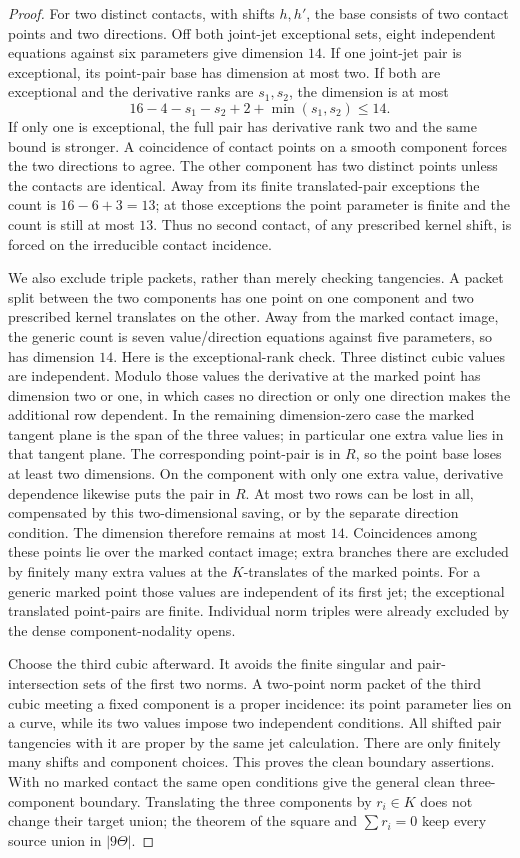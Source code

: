 \begin{proof}
For two distinct contacts, with shifts $h,h'$, the base consists
of two contact points and two directions. Off both joint-jet
exceptional sets, eight independent equations against six
parameters give dimension $14$. If one joint-jet pair is
exceptional, its point-pair base has dimension at most two.
If both are exceptional and the derivative ranks are $s_1,s_2$,
the dimension is at most
\[
       16-4-s_1-s_2+2+\min(s_1,s_2)\le14.        \tag{N9.1}
\]
If only one is exceptional, the full pair has derivative rank two
and the same bound is stronger. A coincidence of contact points
on a smooth component forces the two directions to agree.
The other component has two distinct points unless the contacts
are identical. Away from its finite translated-pair exceptions
the count is $16-6+3=13$; at those exceptions the point parameter
is finite and the count is still at most $13$.
Thus no second contact, of any prescribed kernel shift, is forced
on the irreducible contact incidence.

We also exclude triple packets, rather than merely checking
tangencies. A packet split between the two components has one
point on one component and two prescribed kernel translates on
the other. Away from the marked contact image, the generic count
is seven value/direction equations against five parameters, so
has dimension $14$. Here is the exceptional-rank check. Three
distinct cubic values are independent. Modulo those values the
derivative at the marked point has dimension two or one, in
which cases no direction or only one direction makes the
additional row dependent. In the remaining dimension-zero case
the marked tangent plane is the span of the three values; in
particular one extra value lies in that tangent plane. The
corresponding point-pair is in $R$, so the point base loses at
least two dimensions. On the component with only one extra
value, derivative dependence likewise puts the pair in $R$.
At most two rows can be lost in all, compensated by this
two-dimensional saving, or by the separate direction condition.
The dimension therefore remains at most $14$. Coincidences
among these points lie over the marked contact image; extra
branches there are excluded by finitely many extra values at
the $K$-translates of the marked points. For a generic marked
point those values are independent of its first jet; the
exceptional translated point-pairs are finite. Individual norm
triples were already excluded by the dense component-nodality
opens.

Choose the third cubic afterward. It avoids the finite singular
and pair-intersection sets of the first two norms. A two-point
norm packet of the third cubic meeting a fixed component is a
proper incidence: its point parameter lies on a curve, while
its two values impose two independent conditions. All shifted
pair tangencies with it are proper by the same jet calculation.
There are only finitely many shifts and component choices.
This proves the clean boundary assertions. With no marked contact
the same open conditions give the general clean three-component
boundary. Translating the three components by $r_i\in K$ does
not change their target union; the theorem of the square and
$\sum r_i=0$ keep every source union in $|9\Theta|$.
\end{proof}

